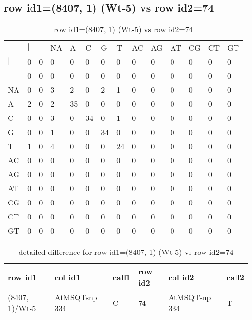 \subsection{row id1=(8407, 1) (Wt-5) vs row id2=74}
\begin{center}
\begin{longtable}{|l|l|l|l|l|l|l|l|l|l|l|l|l|l|}
\caption{row id1=(8407, 1) (Wt-5) vs row id2=74} \label{table_dm670}\\
\hline
\\
\hline
&$|$&-&NA&A&C&G&T&AC&AG&AT&CG&CT&GT\\
$|$&0&0&0&0&0&0&0&0&0&0&0&0&0\\
-&0&0&0&0&0&0&0&0&0&0&0&0&0\\
NA&0&0&3&2&0&2&1&0&0&0&0&0&0\\
A&2&0&2&35&0&0&0&0&0&0&0&0&0\\
C&0&0&3&0&34&0&1&0&0&0&0&0&0\\
G&0&0&1&0&0&34&0&0&0&0&0&0&0\\
T&1&0&4&0&0&0&24&0&0&0&0&0&0\\
AC&0&0&0&0&0&0&0&0&0&0&0&0&0\\
AG&0&0&0&0&0&0&0&0&0&0&0&0&0\\
AT&0&0&0&0&0&0&0&0&0&0&0&0&0\\
CG&0&0&0&0&0&0&0&0&0&0&0&0&0\\
CT&0&0&0&0&0&0&0&0&0&0&0&0&0\\
GT&0&0&0&0&0&0&0&0&0&0&0&0&0\\
\hline
\end{longtable}
\end{center}

\begin{center}
\begin{longtable}{|l|l|l|l|l|l|}
\caption{detailed difference for row id1=(8407, 1) (Wt-5) vs row id2=74} \label{table_dm671}\\
\hline
row id1&col id1&call1&row id2&col id2&call2\\
\hline
(8407, 1)/Wt-5&AtMSQTsnp 334&C&74&AtMSQTsnp 334&T\\
\hline
\end{longtable}
\end{center}

